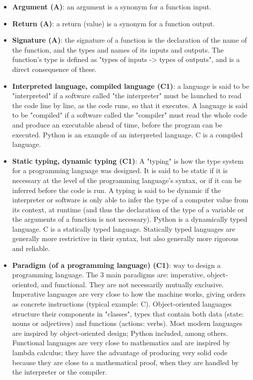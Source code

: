 \documentclass{article}
\begin{document}
\begin{itemize}
    \item \textbf{Argument (A)}: an argument is a synonym for a function input.
    
    \item \textbf{Return (A)}: a return (value) is a synonym for a function output.
    
    \item \textbf{Signature (A)}: the signature of a function is the declaration of the name of the function, and the types and names of its inputs and outputs. The function's type is defined as "types of inputs -> types of outputs", and is a direct consequence of these.

    \item \textbf{Interpreted language, compiled language (C1)}: a language is said to be "interpreted" if a software called "the interpreter" must be launched to read the code line by line, as the code runs, so that it executes. A language is said to be "compiled" if a software called the "compiler" must read the whole code and produce an executable ahead of time, before the program can be executed. Python is an example of an interpreted language. C is a compiled language.
    
    \item \textbf{Static typing, dynamic typing (C1)}: A "typing" is how the type system for a programming language was designed. It is said to be static if it is necessary at the level of the programming language's syntax, or if it can be inferred before the code is run. A typing is said to be dynamic if the interpreter or software is only able to infer the type of a computer value from its context, at runtime (and thus the declaration of the type of a variable or the arguments of a function is not necessary). Python is a dynamically typed language. C is a statically typed language. Statically typed languages are generally more restrictive in their syntax, but also generally more rigorous and reliable.
    
    \item \textbf{Paradigm (of a programming language) (C1)}: way to design a programming language. The 3 main paradigms are: imperative, object-oriented, and functional. They are not necessarily mutually exclusive. Imperative languages are very close to how the machine works, giving orders as concrete instructions (typical example: C). Object-oriented languages structure their components in "classes", types that contain both data (state: nouns or adjectives) and functions (actions: verbs). Most modern languages are inspired by object-oriented design; Python included, among others. Functional languages are very close to mathematics and are inspired by lambda calculus; they have the advantage of producing very solid code because they are close to a mathematical proof, when they are handled by the interpreter or the compiler.
    

\end{itemize}
\end{document}
